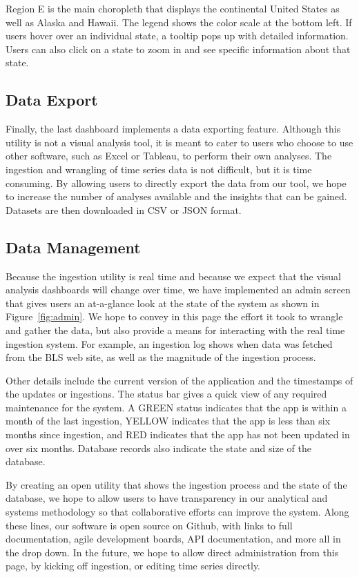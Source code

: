\documentclass[11pt,letterpaper]{article}
\begin{document}
Region E is the main choropleth that displays the continental United States as well as Alaska and Hawaii. The legend shows the color scale at the bottom left. If users hover over an individual state, a tooltip pops up with detailed information. Users can also click on a state to zoom in and see specific information about that state.

\subsection{Data Export}

Finally, the last dashboard implements a data exporting feature. Although this utility is not a visual analysis tool, it is meant to cater to users who choose to use other software, such as Excel or Tableau, to perform their own analyses. The ingestion and wrangling of time series data is not difficult, but it is time consuming. By allowing users to directly export the data from our tool, we hope to increase the number of analyses available and the insights that can be gained. Datasets are then downloaded in CSV or JSON format.

\subsection{Data Management}

Because the ingestion utility is real time and because we expect that the visual analysis dashboards will change over time, we have implemented an admin screen that gives users an at-a-glance look at the state of the system as shown in Figure~\ref{fig:admin}. We hope to convey in this page the effort it took to wrangle and gather the data, but also provide a means for interacting with the real time ingestion system. For example, an ingestion log shows when data was fetched from the BLS web site, as well as the magnitude of the ingestion process.

Other details include the current version of the application and the timestamps of the updates or ingestions. The status bar gives a quick view of any required maintenance for the system. A GREEN status indicates that the app is within a month of the last ingestion, YELLOW indicates that the app is less than six months since ingestion, and RED indicates that the app has not been updated in over six months. Database records also indicate the state and size of the database.

By creating an open utility that shows the ingestion process and the state of the database, we hope to allow users to have transparency in our analytical and systems methodology so that collaborative efforts can improve the system. Along these lines, our software is open source on Github, with links to full documentation, agile development boards, API documentation, and more all in the drop down. In the future, we hope to allow direct administration from this page, by kicking off ingestion, or editing time series directly.
\end{document}
